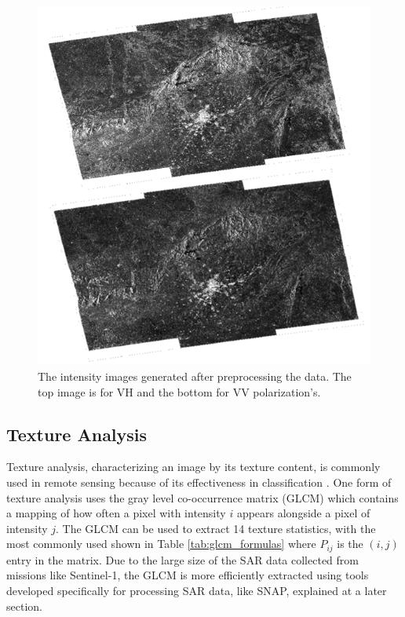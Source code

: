 \documentclass[conference]{IEEEtran}
\begin{document}
	\begin{figure}[htbp]
		\centerline{\includegraphics[scale=0.65]{Images/Data_Processed_Images.PNG}}
		\caption{The intensity images generated after preprocessing the data. The top image is for VH and the bottom for VV polarization's.}
		\label{img:Preprocessed_Images}
	\end{figure}

	\subsection{Texture Analysis}
		Texture analysis, characterizing an image by its texture content, is commonly used in remote sensing because of its effectiveness in classification \cite{Huang_2014}.
		One form of texture analysis uses the gray level co-occurrence matrix (GLCM) which contains a mapping of how often a pixel with intensity $i$ appears alongside a pixel of intensity $j$.
		The GLCM can be used to extract 14 texture statistics, with the most commonly used shown in Table \ref{tab:glcm_formulas} where $P_{ij}$ is the $(i,j)$ entry in the matrix.
		Due to the large size of the SAR data collected from missions like Sentinel-1, the GLCM is more efficiently extracted using tools developed specifically for processing SAR data, like SNAP, explained at a later section.
		
\end{document}
